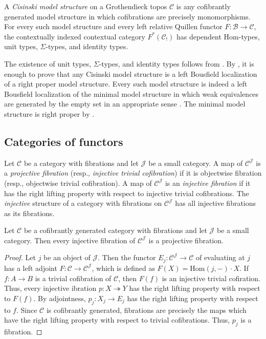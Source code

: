 \documentclass[reqno]{amsart}
\theoremstyle{definition}
\theoremstyle{remark}
\newcommand{\fs}[1]{\mathrm{#1}}
\newcommand{\scat}[1]{\mathcal{#1}}
\newcommand{\Hom}{\fs{Hom}}
\numberwithin{figure}{section}
\begin{document}
\begin{example}[cisinski]
A \emph{Cisinski model structure} on a Grothendieck topos $\scat{C}$ is any cofibrantly generated model structure in which cofibrations are precisely monomorphisms.
For every such model structure and every left relative Quillen functor $F : \scat{B} \to \scat{C}$,
the contextually indexed contextual category $F^*(\scat{C}_!)$ has dependent $\Hom$-types, unit types, $\Sigma$-types, and identity types.

The existence of unit types, $\Sigma$-types, and identity types follows from .
By , it is enough to prove that any Cisinski model structure is a left Bousfield localization of a right proper model structure.
Every such model structure is indeed a left Bousfield localization of the minimal model structure in which weak equivalences are generated by the empty set in an appropriate sense \cite[Th\'{e}or\`{e}me~3.9]{cisinski}.
The minimal model structure is right proper by \cite[Remarque~4.9]{cisinski}.
\end{example}

\subsection{Categories of functors}

Let $\scat{C}$ be a category with fibrations and let $\scat{J}$ be a small category.
A map of $\scat{C}^\scat{J}$ is a \emph{projective fibration} (resp., \emph{injective trivial cofibration}) if it is objectwise fibration (resp., objectwise trivial cofibration).
A map of $\scat{C}^\scat{J}$ is an \emph{injective fibration} if it has the right lifting property with respect to injective trivial cofibrations.
The \emph{injective} structure of a category with fibrations on $\scat{C}^\scat{J}$ has all injective fibrations as its fibrations.

\begin{lem}
Let $\scat{C}$ be a cofibrantly generated category with fibrations and let $\scat{J}$ be a small category.
Then every injective fibration of $\scat{C}^\scat{J}$ is a projective fibration.
\end{lem}
\begin{proof}
Let $j$ be an object of $\scat{J}$.
Then the functor $E_j : \scat{C}^\scat{J} \to \scat{C}$ of evaluating at $j$ has a left adjoint $F : \scat{C} \to \scat{C}^\scat{J}$, which is defined as $F(X) = \Hom(j,-) \cdot X$.
If $f : A \to B$ is a trivial cofibration of $\scat{C}$, then $F(f)$ is an injective trivial cofiration.
Thus, every injective ibration $p : X \twoheadrightarrow Y$ has the right lifting property with respect to $F(f)$.
By adjointness, $p_j : X_j \to E_j$ has the right lifting property with respect to $f$.
Since $\scat{C}$ is cofibrantly generated, fibrations are precisely the maps which have the right lifting property with respect to trivial cofibrations.
Thus, $p_j$ is a fibration.
\end{proof}
\end{document}
